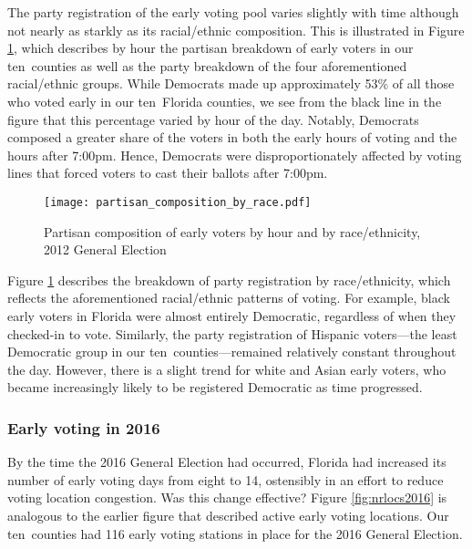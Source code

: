 \documentclass[12pt,titlepage]{article}
\newcommand{\numcounties}{ten}
\begin{document}
The party registration of the early voting pool varies slightly with
time although not nearly as starkly as its racial/ethnic composition.
This is illustrated in Figure \ref{fig:party2012}, which describes by
hour the partisan breakdown of early voters in our \numcounties\
counties as well as the party breakdown of the four aforementioned
racial/ethnic groups.  While Democrats made up approximately 53\% of
all those who voted early in our \numcounties\ Florida counties, we
see from the black line in the figure that this percentage varied by
hour of the day.  Notably, Democrats composed a greater share of the
voters in both the early hours of voting and the hours after 7:00pm.
Hence, Democrats were disproportionately affected by voting lines that
forced voters to cast their ballots after 7:00pm.

\begin{figure}[!ht]
\caption{Partisan composition of early voters by hour and by race/ethnicity, 2012
  General Election}
  \label{fig:party2012}
  \centering
    \centering\texttt{[image: partisan\_composition\_by\_race.pdf]}
\end{figure}




Figure \ref{fig:party2012} describes the breakdown of party
registration by race/ethnicity, which reflects the aforementioned
racial/ethnic patterns of voting.  For example, black early voters in
Florida were almost entirely Democratic, regardless of when they
checked-in to vote.  Similarly, the party registration of Hispanic
voters---the least Democratic group in our \numcounties\
counties---remained relatively constant throughout the day.
However, there is a slight trend for white and Asian early voters, who
became increasingly likely to be registered Democratic as time
progressed.

\subsubsection*{Early voting in 2016}

By the time the 2016 General Election had occurred, Florida had
increased its number of early voting days from eight to 14, ostensibly
in an effort to reduce voting location congestion. Was this change
effective?  Figure \ref{fig:nrlocs2016} is analogous to the earlier
figure that described active early voting locations. Our \numcounties\
counties had 116 early voting stations in place for the 2016 General
Election.
\end{document}

